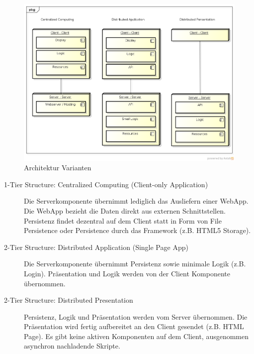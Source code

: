		\begin{figure}[H]
			\includegraphics[width=\textwidth]{architecture/media/img/tierArchitecture.png}
			\centering
			\caption{Architektur Varianten}
			\label{fig:tierArchitecture}
		\end{figure}
		\begin{description}
			\item[1-Tier Structure: Centralized Computing (Client-only Application)]
				Die Serverkomponente übernimmt lediglich das Ausliefern einer WebApp. 
				Die WebApp bezieht die Daten direkt aus externen Schnittstellen. 
				Persistenz findet dezentral auf dem Client statt in Form von File Persistence oder 
				Persistence durch das Framework (z.B. HTML5 Storage).
				
			\item[2-Tier Structure: Distributed Application (Single Page App)]
				Die Serverkomponente übernimmt Persistenz sowie minimale Logik (z.B. Login).
				Präsentation und Logik werden von der Client Komponente übernommen.
				
			\item[2-Tier Structure: Distributed Presentation]
				Persistenz, Logik und Präsentation werden vom Server übernommen.
				Die Präsentation wird fertig aufbereitet an den Client gesendet (z.B. HTML Page).
				Es gibt keine aktiven Komponenten auf dem Client, ausgenommen asynchron nachladende Skripte.				
		\end{description}
	
